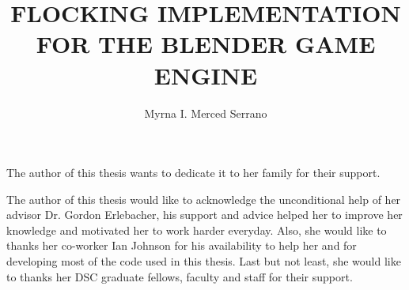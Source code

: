 \documentclass[11pt]{fsuthesis}
\title{FLOCKING IMPLEMENTATION FOR THE BLENDER GAME ENGINE}
\author{Myrna I. Merced Serrano}
\begin{document}
\frontmatter
\maketitle
\makesignaturepage

\begin{dedication}
The author of this thesis wants to dedicate it to her family for their support.
\end{dedication}

\begin{acknowledgments}
The author of this thesis would like to acknowledge the unconditional help of her advisor Dr. Gordon Erlebacher, his support and advice helped her to improve her knowledge and motivated her to work harder everyday. Also, she would like to thanks her co-worker Ian Johnson for his availability to help her and for developing most of the code used in this thesis. Last but not least, she would like to thanks her DSC graduate fellows, faculty and staff for their support.
\end{acknowledgments}

\tableofcontents
\listoftables
\listoffigures




\onehalfspacing
\end{document}
